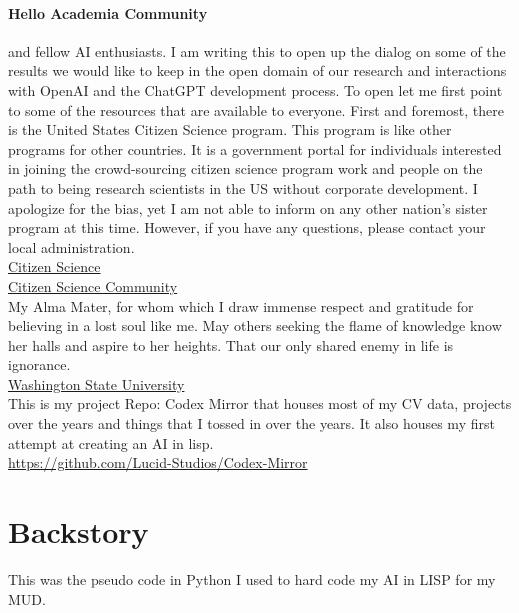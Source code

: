 \documentclass[twocolumn,10pt]{article}
\begin{document}
\paragraph{Hello Academia Community} and fellow AI enthusiasts. I am writing this to open up the dialog on some of the results we would like to keep in the open domain of our research and interactions with OpenAI and the ChatGPT development process.
To open let me first point to some of the resources that are available to everyone.
First and foremost, there is the United States Citizen Science program. This program is like other programs for other countries. It is a government portal for individuals interested in joining the crowd-sourcing citizen science program work and people on the path to being research scientists in the US without corporate development. I apologize for the bias, yet I am not able to inform on any other nation’s sister program at this time. However, if you have any questions, please contact your local administration.\\
\href{https://www.citizenscience.gov/#}{Citizen Science}\\
\href{https://www.citizenscience.gov/about/community-of-practice/#}{Citizen Science Community}\\
My Alma Mater, for whom which I draw immense respect and gratitude for believing in a lost soul like me. May others seeking the flame of knowledge know her halls and aspire to her heights. That our only shared enemy in life is ignorance.\\
\href{https://wsu.edu/}{Washington State University}\\
\newpage
This is my project Repo: Codex Mirror that houses most of my CV data, projects over the years and things that I tossed in over the years. It also houses my first attempt at creating an AI in lisp.\\
\url{https://github.com/Lucid-Studios/Codex-Mirror}

\section*{Backstory}
This was the pseudo code in Python I used to hard code my AI in LISP for my MUD.
\end{document}
